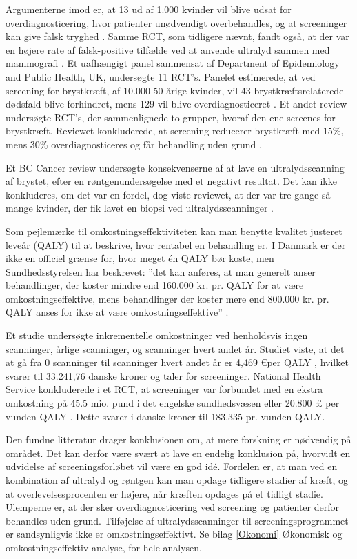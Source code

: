 Argumenterne imod er, at 13 ud af 1.000 kvinder vil blive udsat for overdiagnosticering, hvor patienter unødvendigt overbehandles, og at screeninger kan give falsk tryghed \cite{Argumenter}. Samme RCT, som tidligere nævnt, fandt også, at der var en højere rate af falsk-positive tilfælde ved at anvende ultralyd sammen med mammografi \cite{Japan}. Et uafhængigt panel sammensat af Department of Epidemiology and Public Health, UK, undersøgte 11 RCT’s. Panelet estimerede, at ved screening for brystkræft, af 10.000 50-årige kvinder, vil 43 brystkræftsrelaterede dødsfald blive forhindret, mens 129 vil blive overdiagnosticeret \cite{Panel}. Et andet review undersøgte RCT’s, der sammenlignede to grupper, hvoraf den ene screenes for brystkræft. Reviewet konkluderede, at screening reducerer brystkræft med 15\%, mens 30\% overdiagnosticeres og får behandling uden grund \cite{Gotzche}. 

Et BC Cancer review undersøgte konsekvenserne af at lave en ultralydsscanning af brystet, efter en røntgenundersøgelse med et negativt resultat. Det kan ikke konkluderes, om det var en fordel, dog viste reviewet, at der var tre gange så mange kvinder, der fik lavet en biopsi ved ultralydsscanninger \cite{DenseBreast}.

Som pejlemærke til omkostningseffektiviteten kan man benytte kvalitet justeret leveår (QALY) til at beskrive, hvor rentabel en behandling er. I Danmark er der ikke en officiel grænse for, hvor meget én QALY bør koste, men Sundhedsstyrelsen har beskrevet: ”det kan anføres, at man generelt anser behandlinger, der koster mindre end 160.000 kr. pr. QALY for at være omkostningseffektive, mens behandlinger der koster mere end 800.000 kr. pr. QALY anses for ikke at være omkostningseffektive” \cite{QALY}. 

Et studie undersøgte inkrementelle omkostninger ved henholdsvis ingen scanninger, årlige scanninger, og scanninger hvert andet år. Studiet viste, at det at gå fra 0 scanninger til scanninger hvert andet år er 4,469 \euro per QALY \cite{SpanskStudie}, hvilket svarer til 33.241,76 danske kroner og taler for screeninger. National Health Service konkluderede i et RCT, at screeninger var forbundet med en ekstra omkostning på 45.5 mio. pund i det engelske sundhedsvæsen  eller 20.800 £ per vunden QALY \cite{NHS}. Dette svarer i danske kroner til 183.335 pr. vunden QALY.  

Den fundne litteratur drager konklusionen om, at mere forskning er nødvendig på området. Det kan derfor være svært at lave en endelig konklusion på, hvorvidt en udvidelse af screeningsforløbet vil være en god idé. Fordelen er, at man ved en kombination af ultralyd og røntgen kan man opdage tidligere stadier af kræft, og at overlevelsesprocenten er højere, når kræften opdages på et tidligt stadie. Ulemperne er, at der sker overdiagnosticering ved screening og patienter derfor behandles uden grund. Tilføjelse af ultralydsscanninger til screeningsprogrammet er sandsynligvis ikke er omkostningseffektivt. Se bilag \ref{Okonomi} Økonomisk og omkostningseffektiv analyse, for hele analysen. 
